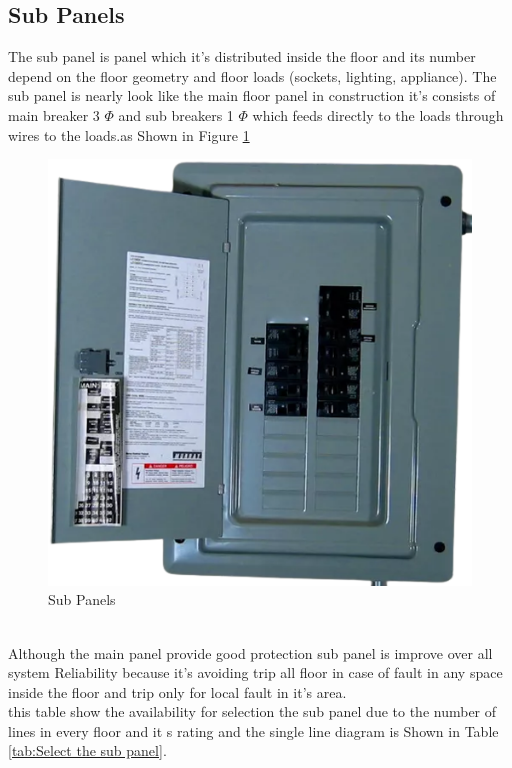 \documentclass[12pt,fleqn]{book} %
\begin{document}
\subsection{Sub Panels}
The sub panel is panel which it’s distributed inside the floor and its number depend on the floor geometry and floor loads (sockets, lighting, appliance). The sub panel is nearly look like the main floor panel in construction it’s consists of main breaker 3 $\Phi$ and sub breakers 1 $\Phi$ which feeds directly to the loads through wires to the loads.as Shown in Figure \ref{fig:fergany 6}
\begin{figure}[h!]
    \centering
    \includegraphics[width=0.5\linewidth]{fergany 6.png}
    \caption{Sub Panels}
    \label{fig:fergany 6}
\end{figure}
\\ Although the main panel provide good protection sub panel is improve over all system Reliability because it's avoiding trip all floor in case of fault in any space inside the floor and trip only for local fault in it's area.
\\ this table show the availability for selection the sub panel due to the number of lines in every floor and it s rating and the single line diagram is Shown in Table \ref{tab:Select the sub panel}.
\end{document}
